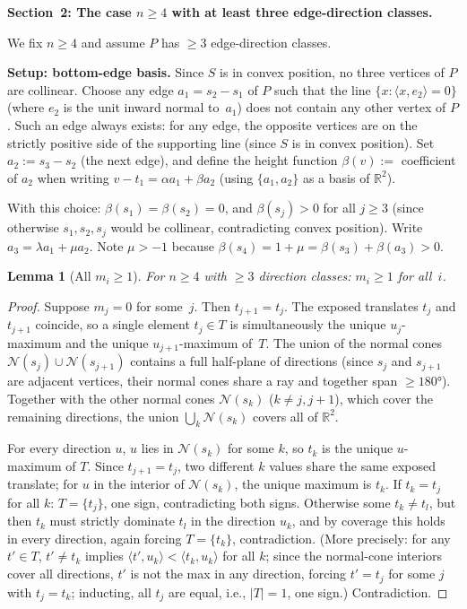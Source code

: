 \documentclass{article}
\newtheorem{lemma}{Lemma}
\begin{document}
\bigskip
\noindent\textbf{Section~2: The case $n\ge 4$ with at least three edge-direction classes.}

We fix $n\ge 4$ and assume $P$ has $\ge 3$ edge-direction classes.

\medskip
\noindent\textbf{Setup: bottom-edge basis.}
Since $S$ is in convex position, no three vertices of $P$ are collinear.
Choose any edge $a_1=s_2-s_1$ of $P$ such that the line $\{x:\langle x,e_2\rangle=0\}$
(where $e_2$ is the unit inward normal to~$a_1$) does not contain any other vertex
of $P$.  Such an edge always exists: for any edge, the opposite vertices are on the
strictly positive side of the supporting line (since $S$ is in convex position).
Set $a_2:=s_3-s_2$ (the next edge), and define the height function
$\beta(v):=$ coefficient of $a_2$ when writing $v-t_1=\alpha a_1+\beta a_2$
(using $\{a_1,a_2\}$ as a basis of $\mathbb{R}^2$).

With this choice: $\beta(s_1)=\beta(s_2)=0$, and $\beta(s_j)>0$ for all $j\ge 3$
(since otherwise $s_1,s_2,s_j$ would be collinear, contradicting convex position).
Write $a_3=\lambda a_1+\mu a_2$.  Note $\mu>-1$ because $\beta(s_4)=1+\mu=\beta(s_3)+\beta(a_3)>0$.

\begin{lemma}[All $m_i\ge 1$]\label{lem:mi1}
For $n\ge 4$ with $\ge 3$ direction classes: $m_i\ge 1$ for all~$i$.
\end{lemma}
\begin{proof}
Suppose $m_j=0$ for some~$j$.  Then $t_{j+1}=t_j$.  The exposed translates
$t_j$ and $t_{j+1}$ coincide, so a single element $t_j\in T$ is simultaneously the
unique $u_j$-maximum and the unique $u_{j+1}$-maximum of~$T$.
The union of the normal cones $\mathcal{N}(s_j)\cup\mathcal{N}(s_{j+1})$ contains a full
half-plane of directions (since $s_j$ and $s_{j+1}$ are adjacent vertices, their normal
cones share a ray and together span $\ge 180°$).  Together with the other normal cones
$\mathcal{N}(s_k)$ ($k\ne j,j+1$), which cover the remaining directions, the union
$\bigcup_k\mathcal{N}(s_k)$ covers all of $\mathbb{R}^2$.

For every direction $u$, $u$ lies in $\mathcal{N}(s_k)$ for some $k$, so $t_k$ is the
unique $u$-maximum of $T$.  Since $t_{j+1}=t_j$, two different $k$ values share the
same exposed translate; for $u$ in the interior of $\mathcal{N}(s_k)$, the unique
maximum is $t_k$.  If $t_k=t_j$ for all $k$: $T=\{t_j\}$, one sign, contradicting
both signs.  Otherwise some $t_k\ne t_l$, but then $t_k$ must strictly dominate $t_l$
in the direction $u_k$, and by coverage this holds in every direction, again forcing
$T=\{t_k\}$, contradiction.  (More precisely: for any $t'\in T$, $t'\ne t_k$ implies
$\langle t',u_k\rangle<\langle t_k,u_k\rangle$ for all $k$; since the normal-cone
interiors cover all directions, $t'$ is not the max in any direction, forcing $t'=t_j$
for some $j$ with $t_j=t_k$; inducting, all $t_j$ are equal, i.e., $|T|=1$, one sign.)
Contradiction.
\end{proof}
\end{document}
